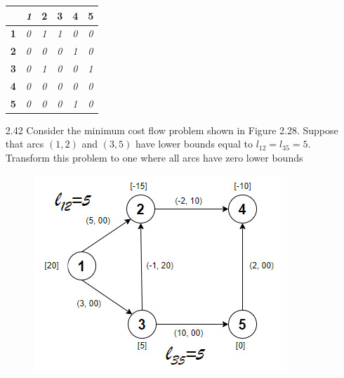 \documentclass{report}
\begin{document}
\begin{enumerate}[2.1]
\begin{table}[ht]
\begin{tabular}{|llllll|}
            \multicolumn{1}{|l|}{}           & \multicolumn{1}{l|}{\textit{\textbf{1}}} & \multicolumn{1}{l|}{\textbf{2}} & \multicolumn{1}{l|}{\textbf{3}} & \multicolumn{1}{l|}{\textbf{4}} & \textbf{5} \\ \hline
            \multicolumn{1}{|l|}{\textbf{1}} & \multicolumn{1}{l|}{\textit{0}}                   & \multicolumn{1}{l|}{\textit{1}} & \multicolumn{1}{l|}{\textit{1}} & \multicolumn{1}{l|}{\textit{0}} & \textit{0} \\ \hline
            \multicolumn{1}{|l|}{\textbf{2}} & \multicolumn{1}{l|}{\textit{0}}                   & \multicolumn{1}{l|}{\textit{0}} & \multicolumn{1}{l|}{\textit{0}} & \multicolumn{1}{l|}{\textit{1}} & \textit{0} \\ \hline
            \multicolumn{1}{|l|}{\textbf{3}} & \multicolumn{1}{l|}{\textit{0}}          & \multicolumn{1}{l|}{\textit{1}} & \multicolumn{1}{l|}{\textit{0}} & \multicolumn{1}{l|}{\textit{0}} & \textit{1} \\ \hline
            \multicolumn{1}{|l|}{\textbf{4}} & \multicolumn{1}{l|}{\textit{0}}          & \multicolumn{1}{l|}{\textit{0}} & \multicolumn{1}{l|}{\textit{0}} & \multicolumn{1}{l|}{\textit{0}} & \textit{0} \\ \hline
            \multicolumn{1}{|l|}{\textbf{5}} & \multicolumn{1}{l|}{\textit{0}}          & \multicolumn{1}{l|}{\textit{0}} & \multicolumn{1}{l|}{\textit{0}} & \multicolumn{1}{l|}{\textit{1}} & \textit{0} \\ \hline
            \end{tabular}
            \end{table}
    \item[2.42] Consider the minimum cost flow problem shown in Figure 2.28. Suppose that arcs
    $(1, 2)$ and $(3, 5)$ have lower bounds equal to $l_{12} = l_{35} = 5$. Transform this problem to
    one where all arcs have zero lower bounds
    \begin{figure}[h!t]
                \begin{minipage}[b]{0.4\linewidth}
                \centering
                \includegraphics[scale = 0.5]{2.42 parte1.jpeg}

\end{minipage}
\end{figure}
\end{enumerate}
\end{document}
